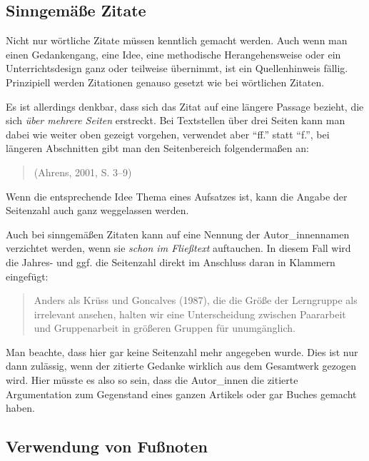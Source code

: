 \documentclass[ngerman,bibliography=totoc,oneside,12pt,a4paper]{scrbook}
\begin{document}
\subsection{Sinngemäße Zitate}\label{sinngemae-zitate}

Nicht nur wörtliche Zitate müssen kenntlich gemacht werden. Auch wenn
man einen Gedankengang, eine Idee, eine methodische Herangehensweise
oder ein Unterrichtsdesign ganz oder teilweise übernimmt, ist ein
Quellenhinweis fällig. Prinzipiell werden Zitationen genauso gesetzt wie
bei wörtlichen Zitaten.

Es ist allerdings denkbar, dass sich das Zitat auf eine längere Passage
bezieht, die sich \emph{über mehrere Seiten} erstreckt. Bei Textstellen
über drei Seiten kann man dabei wie weiter oben gezeigt vorgehen,
verwendet aber \enquote{ff.} statt \enquote{f.}, bei längeren
Abschnitten gibt man den Seitenbereich folgendermaßen an:

\begin{quote}
(Ahrens, 2001, S. 3--9)
\end{quote}

Wenn die entsprechende Idee Thema eines Aufsatzes ist, kann die Angabe
der Seitenzahl auch ganz weggelassen werden.

Auch bei sinngemäßen Zitaten kann auf eine Nennung der Autor\_innennamen
verzichtet werden, wenn sie \emph{schon im Fließtext} auftauchen. In
diesem Fall wird die Jahres- und ggf. die Seitenzahl direkt im Anschluss
daran in Klammern eingefügt:

\begin{quote}
Anders als Krüss und Goncalves (1987), die die Größe der Lerngruppe als
irrelevant ansehen, halten wir eine Unterscheidung zwischen Paararbeit
und Gruppenarbeit in größeren Gruppen für unumgänglich.
\end{quote}

Man beachte, dass hier gar keine Seitenzahl mehr angegeben wurde. Dies
ist nur dann zulässig, wenn der zitierte Gedanke wirklich aus dem
Gesamtwerk gezogen wird. Hier müsste es also so sein, dass die
Autor\_innen die zitierte Argumentation zum Gegenstand eines ganzen
Artikels oder gar Buches gemacht haben.

\subsection*{Verwendung von Fußnoten}\label{verwendung-von-fuuxdfnoten}
\end{document}

